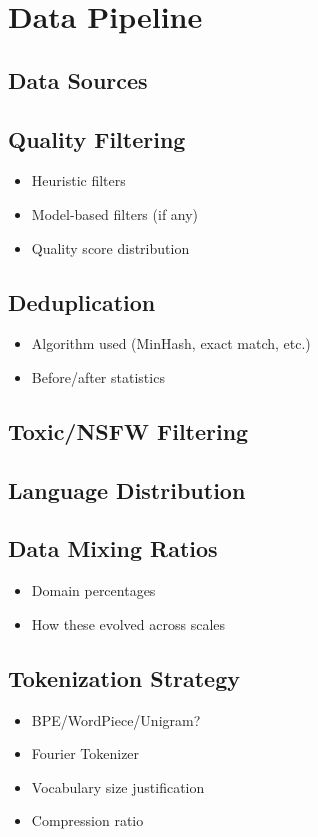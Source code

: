 \section {Data Pipeline}

    \subsection{Data Sources} 
    \subsection{Quality Filtering}
        \begin{itemize}
            \item Heuristic filters
            \item Model-based filters (if any)
            \item Quality score distribution
        \end{itemize}
    
    \subsection{Deduplication} 
        \begin{itemize}
            \item Algorithm used (MinHash, exact match, etc.)
            \item Before/after statistics
        \end{itemize}

    \subsection{Toxic/NSFW Filtering}

    \subsection{Language Distribution}

    \subsection{Data Mixing Ratios}
        \begin{itemize}
            \item Domain percentages
            \item How these evolved across scales
        \end{itemize}

    \subsection{Tokenization Strategy}
        \begin{itemize}
            \item BPE/WordPiece/Unigram?
            \item Fourier Tokenizer
            \item Vocabulary size justification
            \item Compression ratio
        \end{itemize}